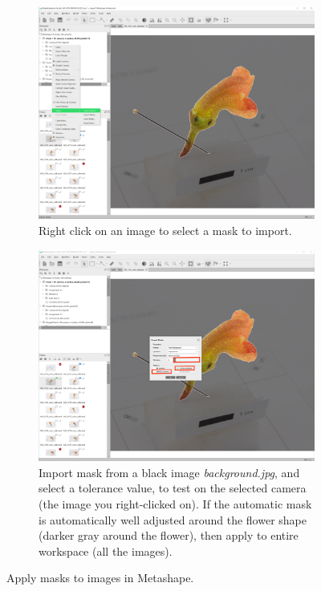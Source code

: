 \documentclass[10pt,letter,english]{article}
\begin{document}
\begin{figure}[H]
\centering
\begin{subfigure}[t]{.45\textwidth}
  \centering
  \includegraphics[width=1\textwidth]{Figures/Metashape_mask_right_click.png}
  \caption{Right click on an image to select a mask to import.}
  \label{}
\end{subfigure}%
\hspace{0.5cm}
\begin{subfigure}[t]{.45\textwidth}
  \centering
  \includegraphics[width=1\textwidth]{Figures/Metashape_masks_tolerance.png}
  \caption{Import mask from a black image \textit{background.jpg}, and select a tolerance value, to test on the selected camera (the image you right-clicked on). If the automatic mask is automatically well adjusted around the flower shape (darker gray around the flower), then apply to entire workspace (all the images).}
  \label{}
\end{subfigure}
\caption{Apply masks to images in Metashape.}
\label{}
\end{figure}
\end{document}
